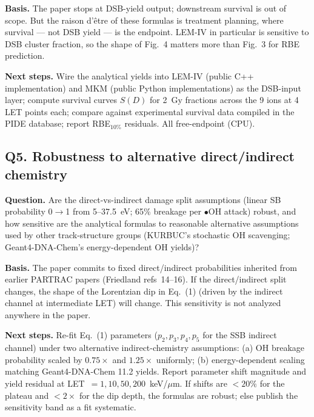 \textbf{Basis.} The paper stops at DSB-yield output; downstream survival is out of scope. But the raison d'\^etre of these formulas is treatment planning, where survival --- not DSB yield --- is the endpoint. LEM-IV in particular is sensitive to DSB cluster fraction, so the shape of Fig.~4 matters more than Fig.~3 for RBE prediction.

\textbf{Next steps.} Wire the analytical yields into LEM-IV (public C++ implementation) and MKM (public Python implementations) as the DSB-input layer; compute survival curves $S(D)$ for 2~Gy fractions across the 9 ions at 4 LET points each; compare against experimental survival data compiled in the PIDE database; report RBE${}_{10\%}$ residuals. All free-endpoint (CPU).

\subsection*{Q5. Robustness to alternative direct/indirect chemistry}
\textbf{Question.} Are the direct-vs-indirect damage split assumptions (linear SB probability 0$\rightarrow$1 from 5--37.5~eV; 65\% breakage per $\bullet$OH attack) robust, and how sensitive are the analytical formulas to reasonable alternative assumptions used by other track-structure groups (KURBUC's stochastic OH scavenging; Geant4-DNA-Chem's energy-dependent OH yields)?

\textbf{Basis.} The paper commits to fixed direct/indirect probabilities inherited from earlier PARTRAC papers (Friedland refs~14--16). If the direct/indirect split changes, the shape of the Lorentzian dip in Eq.~(1) (driven by the indirect channel at intermediate LET) will change. This sensitivity is not analyzed anywhere in the paper.

\textbf{Next steps.} Re-fit Eq.~(1) parameters ($p_2, p_3, p_4, p_5$ for the SSB indirect channel) under two alternative indirect-chemistry assumptions: (a) OH breakage probability scaled by $0.75\times$ and $1.25\times$ uniformly; (b) energy-dependent scaling matching Geant4-DNA-Chem 11.2 yields. Report parameter shift magnitude and yield residual at LET~$=1, 10, 50, 200$~keV/$\mu$m. If shifts are $<20\%$ for the plateau and $<2\times$ for the dip depth, the formulas are robust; else publish the sensitivity band as a fit systematic.
